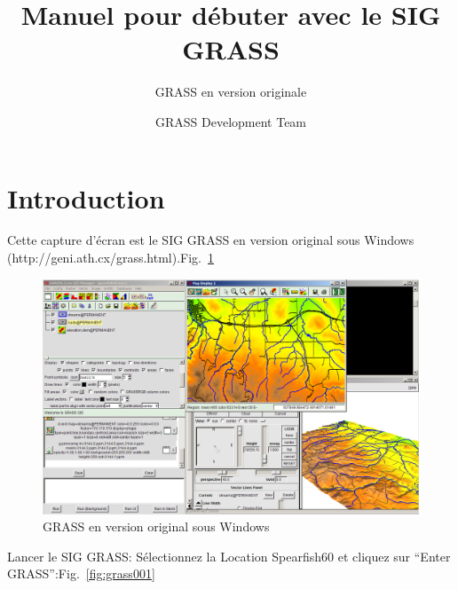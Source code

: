 %


\title{Manuel pour d\'ebuter avec le SIG GRASS}
\subtitle{GRASS en version originale}
\author{GRASS Development Team}

\maketitle

\section{Introduction}

Cette capture d'\'ecran est le SIG GRASS en version original sous Windows
(http://geni.ath.cx/grass.html).Fig.~\ref{fig:grass000}
\begin{figure}[htbp]
   \centering
   \includegraphics[scale=0.15]{grass000.png}
   \caption{GRASS en version original sous Windows}
   \label{fig:grass000}
\end{figure}

Lancer le SIG GRASS: S\'electionnez la Location Spearfish60 et cliquez sur
``Enter GRASS'':Fig.~\ref{fig:grass001}

